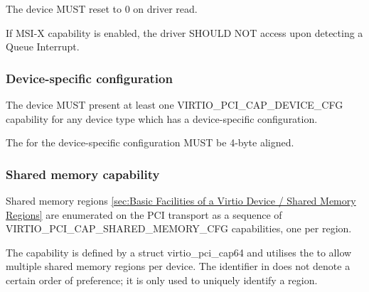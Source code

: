 The device MUST reset  to 0 on driver read.


If MSI-X capability is enabled, the driver SHOULD NOT access
 upon detecting a Queue Interrupt.

\subsubsection{Device-specific configuration}\label{sec:Virtio Transport Options / Virtio Over PCI Bus / PCI Device Layout / Device-specific configuration}

The device MUST present at least one VIRTIO_PCI_CAP_DEVICE_CFG capability for
any device type which has a device-specific configuration.


The  for the device-specific configuration MUST be 4-byte aligned.

\subsubsection{Shared memory capability}\label{sec:Virtio Transport Options / Virtio Over PCI Bus / PCI Device Layout / Shared memory capability}

Shared memory regions \ref{sec:Basic Facilities of a Virtio
Device / Shared Memory Regions} are enumerated on the PCI transport
as a sequence of VIRTIO_PCI_CAP_SHARED_MEMORY_CFG capabilities, one per region.

The capability is defined by a struct virtio_pci_cap64 and
utilises the  to allow multiple shared memory
regions per device.
The identifier in  does not denote a certain order of
preference; it is only used to uniquely identify a region.


